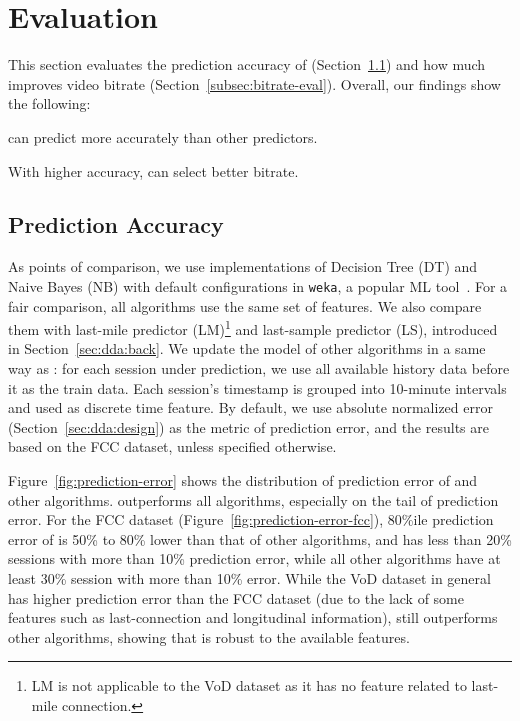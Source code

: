 \section{Evaluation}
\label{sec:dda:eval}


This section evaluates the prediction accuracy of \name (Section~\ref{subsec:accuracy-eval}) and how much \name improves video bitrate (Section~\ref{subsec:bitrate-eval}). Overall, our findings show the following: 
\begin{packedenumerate}
\item \name can predict more accurately than other predictors.
\item With higher accuracy, \name can select better bitrate.
\end{packedenumerate}

\subsection{Prediction Accuracy}
\label{subsec:accuracy-eval}


 As points of comparison, we use implementations of Decision Tree (DT) and Naive Bayes (NB) with default configurations in \texttt{weka}, a popular ML tool~\cite{weka}. For a fair comparison, all algorithms use the same set of features. We also compare them with last-mile predictor (LM)\footnote{LM is not applicable to the VoD dataset as it has no feature related to last-mile connection.} and last-sample predictor (LS), introduced in Section~\ref{sec:dda:back}. We update the model of other algorithms in a same way as \name: for each session under prediction, we use all available history data before it as the train data. Each session's timestamp is grouped into 10-minute intervals and used as discrete time feature. By default, we use absolute normalized error (Section~\ref{sec:dda:design}) as the metric of prediction error, and the results are based on the FCC dataset, unless specified otherwise.

 Figure~\ref{fig:prediction-error} shows the distribution of prediction error of \name and other algorithms.
\name outperforms all algorithms, especially on the tail of prediction error. For the FCC dataset (Figure~\ref{fig:prediction-error-fcc}), 80\%ile prediction error of \name is 50\% to 80\% lower than that of other algorithms, and \name has less than 20\% sessions with more than 10\% prediction error, while all other algorithms have at least 30\% session with more than 10\% error. While the VoD dataset in general has higher prediction error than the FCC dataset (due to the lack of some features such as last-connection and longitudinal information), \name still outperforms other algorithms, showing that \name is robust to the available features.

